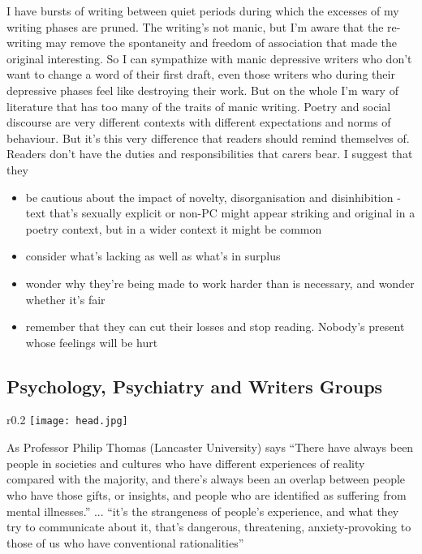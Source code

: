 \documentclass[11pt]{article}
\begin{document}
I have bursts of writing between quiet periods during which the excesses of my writing phases are pruned. The writing's not manic, but I'm aware that the re-writing may remove the spontaneity and freedom of association that made the original interesting. So I can sympathize with manic depressive writers who don't want to change a word of their first draft, even those writers who during their depressive phases feel like destroying their work. But on the whole I'm wary of literature that has too many of the traits of manic writing. Poetry and social discourse are very different contexts with different expectations and norms of behaviour. But it's this very difference that readers should remind themselves of. Readers don't have the duties and responsibilities that carers bear. I suggest that they  
\begin{itemize}
\item be cautious about the impact of novelty, disorganisation and disinhibition - text that's sexually explicit or non-PC might appear striking and original in a poetry context, but in a wider context it might be common
\item consider what's lacking as well as what's in surplus
\item wonder why they're being made to work harder than is necessary, and wonder whether it's fair
\item remember that they can cut their losses and stop reading. Nobody's present whose feelings will be hurt
\end{itemize}

\newpage
\subsection{Psychology, Psychiatry and Writers Groups}
\begin{wrapfigure}{r}{0.2\textwidth}
\centering
\texttt{[image: head.jpg]}
\end{wrapfigure}
As Professor Philip Thomas (Lancaster University) says ``There have always been people in societies and cultures who have different experiences of reality compared with the majority, and there's always been an overlap between people who have those gifts, or insights, and people who are identified as suffering from mental illnesses.'' ... ``it's the strangeness of people's experience, and what they try to communicate about it, that's dangerous, threatening, anxiety-provoking to those of us who have conventional rationalities''
\end{document}
